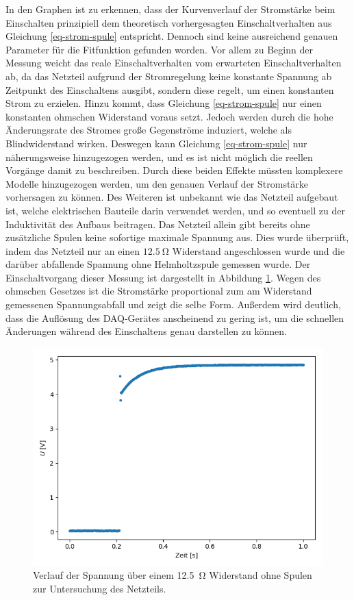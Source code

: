 \documentclass[page,pdftex,12pt,a4paper,twoside,openright]{scrbook}
\begin{document}
In den Graphen ist zu erkennen, dass der Kurvenverlauf der Stromstärke beim Einschalten prinzipiell dem theoretisch vorhergesagten Einschaltverhalten aus Gleichung \ref{eq-strom-spule} entspricht. Dennoch sind keine ausreichend genauen Parameter für die Fitfunktion gefunden worden. Vor allem zu Beginn der Messung weicht das reale Einschaltverhalten vom erwarteten Einschaltverhalten ab, da das Netzteil aufgrund der Stromregelung keine konstante Spannung ab Zeitpunkt des Einschaltens ausgibt, sondern diese regelt, um einen konstanten Strom zu erzielen. Hinzu kommt, dass Gleichung \ref{eq-strom-spule} nur einen konstanten ohmschen Widerstand voraus setzt. Jedoch werden durch die hohe Änderungsrate des Stromes große Gegenströme induziert, welche als Blindwiderstand wirken. Deswegen kann Gleichung \ref{eq-strom-spule} nur näherungsweise hinzugezogen werden, und es ist nicht möglich die reellen Vorgänge damit zu beschreiben. Durch diese beiden Effekte müssten komplexere Modelle hinzugezogen werden, um den genauen Verlauf der Stromstärke vorhersagen zu können. Des Weiteren ist unbekannt wie das Netzteil aufgebaut ist, welche elektrischen Bauteile darin verwendet werden, und so eventuell zu der Induktivität des Aufbaus beitragen. Das Netzteil allein gibt bereits ohne zusätzliche Spulen keine sofortige maximale Spannung aus. Dies wurde überprüft, indem das Netzteil nur an einen \(\SI{12.5}{\ohm}\) Widerstand angeschlossen wurde und die darüber abfallende Spannung ohne Helmholtzspule gemessen wurde. Der Einschaltvorgang dieser Messung ist dargestellt in Abbildung \ref{fig-12ohm}. Wegen des ohmschen Gesetzes ist die Stromstärke proportional zum am Widerstand gemessenen Spannungsabfall und zeigt die selbe Form. Außerdem wird deutlich, dass die Auflösung des DAQ-Gerätes anscheinend zu gering ist, um die schnellen Änderungen während des Einschaltens genau darstellen zu können.

\begin{figure}[h]
\centering
\includegraphics[width=.5\textwidth]{img/12,5ohm.png}
\caption{\label{fig-12ohm}
Verlauf der Spannung über einem \SI{12.5}{\ohm} Widerstand ohne Spulen zur Untersuchung des Netzteils.}
\end{figure}
\end{document}
